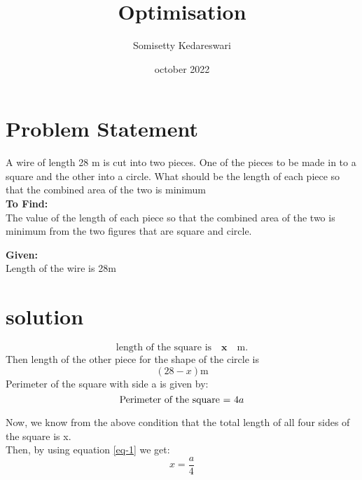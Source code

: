 \documentclass[journal,12pt,twocolumn]{IEEEtran}
\title{Optimisation}
\author{Somisetty Kedareswari}
\date{october 2022}
\let\vec\mathbf
\begin{document}
\maketitle
\section{Problem Statement}

\noindent A wire of length 28 m is cut into two pieces. One of the pieces to be made in to a square and the other into a circle. What should be the length of each piece so that the combined area of the two is minimum \\

\noindent \textbf{To Find:} \\
The value of the length of each piece so that the combined area of the two is minimum from the two figures that are square and circle.

\noindent \textbf{Given:} \\
Length of the wire is 28m
\section{solution}
\begin{equation}
\text{length of the square is} \quad \vec{x} \quad \text{m} .
\end{equation} 
Then length of the other piece for the shape of the circle is \begin{equation}
(28-x) \text{m}
\end{equation} 
Perimeter of the square with side a is given by: \\
\begin{equation}
\text{Perimeter of the square = } 4a \\
\label{eq-1}
\end{equation}

Now, we know from the above condition that the total length of all four sides of the square is x.\\

Then, by using equation \ref{eq-1} we get:
\begin{equation}
x = \frac{a}{4}
\end{equation}
\end{document}
